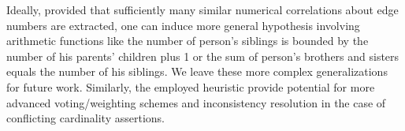  
 

 Ideally, provided that sufficiently many similar numerical correlations about %
 edge numbers %
are extracted, one can induce more general hypothesis involving arithmetic functions like the number of person's siblings is bounded by the number of his parents' children plus 1 or the sum of person's brothers and sisters equals the number of his siblings.  %
 We leave these more complex generalizations for future work. Similarly, the employed heuristic provide potential for more advanced voting/weighting schemes and inconsistency resolution in the case of conflicting cardinality assertions.

